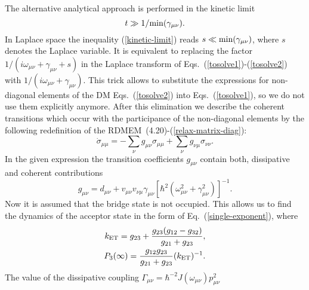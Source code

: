 \documentclass[12pt,twoside,a4paper]{report}
\begin{document}
The alternative analytical approach 
is performed in the kinetic 
limit 
\begin{equation}
\label{kinetic-limit}
t \gg{}1/    {\rm min}  (\gamma_{ \mu  \nu }).  
\end{equation}
In Laplace space the inequality (\ref{kinetic-limit}) reads
$ s \ll{}    {\rm min}  (\gamma_{ \mu  \nu })$, 
where $s$ denotes the Laplace variable. 
It is equivalent to replacing  
the factor $1/(i\omega_{ \mu  \nu }+\gamma_{ \mu  \nu }+s)$  
in the Laplace transform of Eqs.~(\ref{tosolve1})-(\ref{tosolve2})
with $1/(i\omega_{ \mu  \nu }+\gamma_{ \mu  \nu })$.
This trick allows to substitute the expressions for non-diagonal 
elements of the DM Eqs.~(\ref{tosolve2}) 
into Eqs.~(\ref{tosolve1}), so
we do not use them explicitly anymore. 
After this elimination we describe  the coherent 
transitions which occur  with the participance of the 
non-diagonal elements by the following 
redefinition of
the RDMEM~(4.20)-(\ref{relax-matrix-diag}): 
\begin{equation}
\label{relax-matrix-new}
\dot
\sigma
  _{\mu  
    \mu}
             =   - \sum_ \nu  
                      g_{ \mu  \nu }\sigma_{ \mu  \mu }
                 + \sum_ \nu  
                      g_{ \nu  \mu }\sigma_{ \nu  \nu }.
\end{equation} 
In the given expression the transition coefficients $g_{ \mu  \nu }$ 
contain both, dissipative and coherent contributions
\begin{equation} 
\label{dissipation}
g_{ \mu  \nu }
      =    d_{ \mu  \nu }  
        +  v_{ \mu  \nu }v_{ \nu  \mu }
           \gamma_{ \mu  \nu }
           \left[
               \hbar^2
               \left(
                    \omega^2_{ \mu  \nu }
                   +\gamma^2_{ \mu  \nu }
               \right)
           \right]^{-1}. 
\end{equation} 
Now it is assumed that the bridge state is not occupied. This allows us to find 
the dynamics of the acceptor state in the form of Eq.~(\ref{single-exponent}),
where 
\begin{eqnarray} 
\label{rate}
k_{\rm ET}
            =     g_{23}
               +  \frac{g_{23}(g_{12}-g_{32})}
                       {g_{21}+g_{23}},
\\ 
\label{population}
P_3(\infty)
            =     \frac{g_{12}g_{23}}
                       {g_{21}+g_{23}}
                  (k_{\rm ET})^{-1}. 
\end{eqnarray} 
The value of the dissipative coupling 
$\Gamma_{\mu{}\nu}=\hbar^{-2} J(\omega_{\mu \nu})p^2_{\mu{}\nu}$ 
\end{document}
